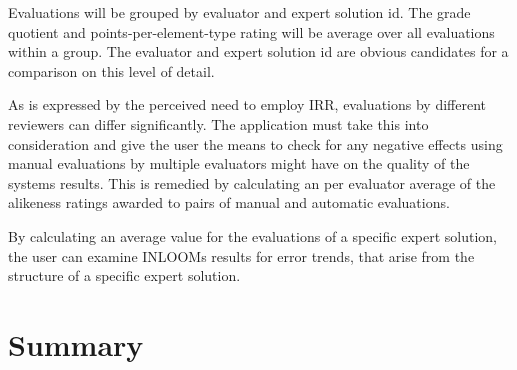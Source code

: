Evaluations will be grouped by evaluator and expert solution id. The grade quotient and 
points-per-element-type rating will be average over all evaluations within a group. 
The evaluator and expert solution id are obvious candidates for a comparison on this level 
of detail. 

As is expressed by the perceived need to employ IRR, evaluations by different reviewers can 
differ significantly. The application must take this into consideration and give the user the 
means to check for any negative effects using manual evaluations by multiple evaluators might 
have on the quality of the systems results. This is remedied by calculating an per evaluator
average of the alikeness ratings awarded to pairs of manual and automatic evaluations.

By calculating an average value for the evaluations of a specific expert solution, the user 
can examine INLOOMs results for error trends, that arise from the structure of a specific 
expert solution. 

\section{Summary}

